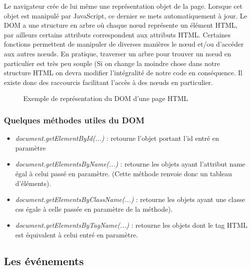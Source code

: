 \documentclass{article}[12pt]
\begin{document}
Le navigateur crée de lui même une représentation objet de la page. Lorsque cet objet est manipulé par JavaScript, ce dernier se mets automatiquement à jour.
\newline
\newline
Le DOM a une structure en arbre où chaque nœud représente un élément HTML, par ailleurs certains attributs correspondent aux attributs HTML. Certaines fonctions permettent de manipuler de diverses manières le nœud et/ou d'accéder 	aux autres nœuds.
\newline
\newline
En pratique, traverser un arbre pour trouver un nœud en particulier est très peu souple  (Si on change la moindre chose dans notre structure HTML on devra modifier l'intégralité de notre code en conséquence. Il existe donc des raccourcis facilitant l'accès à des nœuds en particulier.
\begin{figure}[H]
	\centering
    \caption{Exemple de représentation du DOM d'une page HTML}
\end{figure}

\subsubsection{Quelques méthodes utiles du DOM}
\begin{itemize}
	\item \emph{document.getElementById(...)} : retourne l'objet portant l'id entré en paramètre
    \item \emph{document.getElementsByName(...) } : retourne les objets ayant l'attribut name égal à celui passé en paramètre. (Cette méthode renvoie donc un tableau d'éléments).
    \item \emph{document.getElementsByClassName(...)} : retourne les objets ayant une classe css égale à celle passée en paramètre de la méthode).
    \item \emph{document.getElementsByTagName(...)} : retourne les objets dont le tag HTML est équivalent à celui entré en paramètre.
\end{itemize}

\subsection{Les événements}
\end{document}
